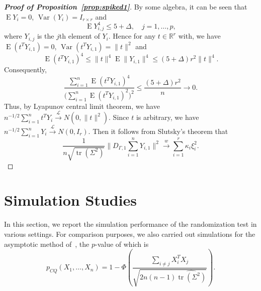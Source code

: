 \documentclass[review]{elsarticle}
\DeclareMathOperator{\mytr}{tr}
\DeclareMathOperator{\myE}{E}
\DeclareMathOperator{\myVar}{Var}
\theoremstyle{plain}
\theoremstyle{definition}
\theoremstyle{remark}
\begin{document}
\begin{proof}[\textbf{Proof of Proposition~\ref{prop:spiked1}}]
    By some algebra, it can be seen that $\myE Y_i=0$, $\myVar (Y_i)=I_{r\times r}$ and
    $$
    \myE Y_{i,j}^4\leq 5+\Delta, \quad
j=1,\ldots,p,
    $$
  where $Y_{i,j}$ is the $j$th  element of $Y_i$.
    Hence for any $t\in\mathbb{R}^r$ with, we have $\myE (t^T Y_{i,1})=0$, $\myVar (t^T Y_{i,1})=\|t\|^2$ and
    $$
    \myE (t^T Y_{i,1})^4 
    \leq \|t\|^4\myE \|Y_{i,1}\|^4 \leq (5+\Delta)r^2 \|t\|^4.
    $$
    Consequently,
    $$
    \frac{
        \sum_{i=1}^n \myE (t^T Y_{i,1})^4 
    }{
        \big(\sum_{i=1}^n \myE (t^T Y_{i,1})^2 \big)^2
    }
    \leq
    \frac{(5+\Delta)r^2 }{n}\to 0.
    $$
    Thus, by Lyapunov central limit theorem, we have $n^{-1/2} \sum_{i=1}^n t^T Y_i\xrightarrow{\mathcal{L}} N(0,\|t\|^2)$. Since $t$ is arbitrary, we have $n^{-1/2}\sum_{i=1}^n Y_i\xrightarrow{\mathcal{L}} N(0,I_{r})$.
    Then it follows from Slutsky's theorem that
    $$
    \frac{1}{n\sqrt{\mytr(\Sigma^2)}}\big\| D_{\Gamma,1}\sum_{i=1}^n Y_{i,1}\big\|^2
    \xrightarrow{w} \sum_{i=1}^r \kappa_i \xi_i^2.
    $$

\end{proof}








\section{Simulation Studies}

In this section, we report the simulation performance of the randomization test in various settings.
For comparison purposes, we also carried out simulations for the asymptotic method of~\citet{Chen2010A},
the $p$-value of which is
\begin{equation*}
p_{CQ}(X_1,\ldots,X_n)=1-\Phi\left(\frac{\sum_{i\neq j}X_i^T X_j}{\sqrt{2n(n-1)\widehat{\mytr(\Sigma^2)}}}\right).
\end{equation*}
\end{document}
